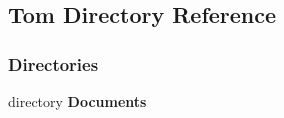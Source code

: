 \subsection{Tom Directory Reference}
\label{dir_d8aa870ec91a941ca39a1dbdb520c5a1}
\subsubsection*{Directories}
\begin{DoxyCompactItemize}
\item 
directory \textbf{ Documents}
\end{DoxyCompactItemize}
